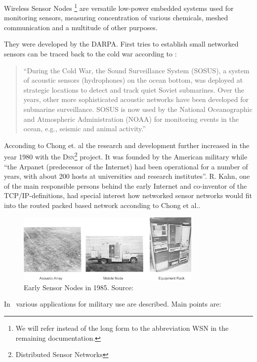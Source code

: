 Wireless Sensor Nodes \footnote{We will refer instead of the long form to the abbreviation \textsc{WSN} in the remaining documentation.}
are versatile low-power embedded systems used for monitoring sensors, measuring concentration of various chemicals, meshed communication
and a multitude of other purposes.

They were developed by the DARPA\cite{Song}. First tries to establish small networked sensors can be traced back to the cold war according to
\cite{Chong}:

\begin{quote}
    ``During the Cold War, the Sound Surveillance System
    (SOSUS), a system of acoustic sensors (hydrophones) on the
    ocean bottom, was deployed at strategic locations to detect
    and track quiet Soviet submarines. Over the years, other
    more sophisticated acoustic networks have been developed
    for submarine surveillance. SOSUS is now used by the
    National Oceanographic and Atmospheric Administration
    (NOAA) for monitoring events in the ocean, e.g., seismic
    and animal activity.''
\end{quote}

Acconding to Chong et. al the research and development further increased in the year 1980 with the \textsc{Dsn}\footnote{Distributed Sensor Networks} project.
It was founded by the American military while 
``the Arpanet (predecessor of the Internet) had been operational for a number of years, with 
about 200 hosts at universities and research institutes''\cite{Chong}.
R. Kahn, one of the main responsible persons behind the early Internet and co-inventor of the TCP/IP-definitions, had special interest how networked
sensor networks would fit into the routed packed based network acconding to Chong et al..

\begin{figure}[H]
   \centering
   \includegraphics[width=0.8\textwidth]{pic/earlynode.png}%
   \caption{Early Sensor Nodes in 1985. Source: \cite{Chong}}
   \label{earlynode}%
\end{figure}

In~\cite{Akyildiz02wirelesssensor} various applications for military use are described. Main points are:

